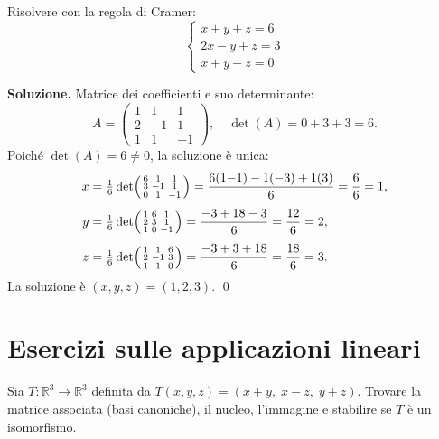 \medskip

\begin{examplebox}
Risolvere con la regola di Cramer:
\[ \begin{cases} x + y + z = 6 \\ 2x - y + z = 3 \\ x + y - z = 0 \end{cases} \]
\end{examplebox}

\textbf{Soluzione.} Matrice dei coefficienti e suo determinante:
\[ A = \begin{pmatrix} 1 & 1 & 1 \\ 2 & -1 & 1 \\ 1 & 1 & -1 \end{pmatrix}, \quad \det(A) = 0 + 3 + 3 = 6. \]
Poiché $\det(A) = 6 \neq 0$, la soluzione è unica:
\begin{align*}
    x &= \tfrac{1}{6}\det\begin{psmallmatrix} 6 & 1 & 1 \\ 3 & -1 & 1 \\ 0 & 1 & -1 \end{psmallmatrix} = \frac{6(1{-}1) - 1(-3) + 1(3)}{6} = \frac{6}{6} = 1, \\[4pt]
    y &= \tfrac{1}{6}\det\begin{psmallmatrix} 1 & 6 & 1 \\ 2 & 3 & 1 \\ 1 & 0 & -1 \end{psmallmatrix} = \frac{-3+18-3}{6} = \frac{12}{6} = 2, \\[4pt]
    z &= \tfrac{1}{6}\det\begin{psmallmatrix} 1 & 1 & 6 \\ 2 & -1 & 3 \\ 1 & 1 & 0 \end{psmallmatrix} = \frac{-3+3+18}{6} = \frac{18}{6} = 3.
\end{align*}
La soluzione è $(x, y, z) = (1, 2, 3)$. \qed

\section[Applicazioni lineari]{Esercizi sulle applicazioni lineari}
\label{sec:es-applicazioni}

\begin{examplebox}
Sia $T \colon \mathbb{R}^3 \to \mathbb{R}^3$ definita da $T(x,y,z) = (x+y, \; x-z, \; y+z)$. Trovare la matrice associata (basi canoniche), il nucleo, l'immagine e stabilire se $T$ è un isomorfismo.
\end{examplebox}

